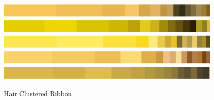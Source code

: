 \documentclass{article}
\begin{document}
\begin{figure}[htbp]
    \centering
        {\includegraphics[width=\textwidth]{main_files/figure-latex/15_2_orange_marilyn_hair_color_ribbon.pdf}}
        {\includegraphics[width=\textwidth]{main_files/figure-latex/18_2_red_marilyn_hair_color_ribbon.pdf}}
        {\includegraphics[width=\textwidth]{main_files/figure-latex/21_2_turq_marilyn_hair_color_ribbon.pdf}}
        {\includegraphics[width=\textwidth]{main_files/figure-latex/24_2_blue_marilyn_hair_color_ribbon.pdf}}
        {\includegraphics[width=\textwidth]{main_files/figure-latex/27_2_eggblue_marilyn_hair_color_ribbon.pdf}}
    \caption{Hair Clustered Ribbon}
\end{figure}
\end{document}
